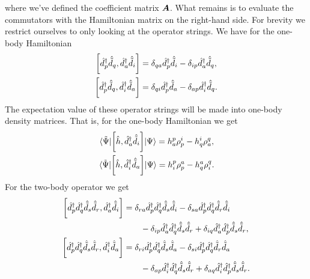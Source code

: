             where we've defined the coefficient matrix $\boldsymbol{A}$.
            What remains is to evaluate the commutators with the Hamiltonian
            matrix on the right-hand side.
            For brevity we restrict ourselves to only looking at the operator
            strings.
            We have for the one-body Hamiltonian
            \begin{gather}
                \left[\hat{d}^{\dagger}_{p}\hat{\tilde{d}}_{q}, \hat{d}^{\dagger}_{a}\hat{\tilde{d}}_{i}\right]
                = \delta_{qa}\hat{d}^{\dagger}_{p}\hat{\tilde{d}}_{i}
                - \delta_{ip}\hat{d}^{\dagger}_{a}\hat{\tilde{d}}_{q}, \\
                \left[\hat{d}^{\dagger}_{p}\hat{\tilde{d}}_{q}, \hat{d}^{\dagger}_{i}\hat{\tilde{d}}_{a}\right]
                = \delta_{qi}\hat{d}^{\dagger}_{p}\hat{\tilde{d}}_{a}
                - \delta_{ap}\hat{d}^{\dagger}_{i}\hat{\tilde{d}}_{q}.
            \end{gather}
            The expectation value of these operator strings will be made into
            one-body density matrices.
            That is, for the one-body Hamiltonian we get
            \begin{gather}
                \mel*{\tilde{\Psi}}{
                    \left[
                        \hat{h}
                    , 
                        \hat{d}^{\dagger}_{a}
                        \hat{\tilde{d}}_{i}
                    \right]
                }{\Psi}
                = h^{p}_{a}\rho^{i}_{p}
                - h^{i}_{q}\rho^{q}_{a},
                \\
                \mel*{\tilde{\Psi}}{
                    \left[
                        \hat{h}
                    , 
                        \hat{d}^{\dagger}_{i}
                        \hat{\tilde{d}}_{a}
                    \right]
                }{\Psi}
                =
                h^{p}_{i}\rho^{a}_{p}
                -
                h^{a}_{q}\rho^{q}_{i}.
            \end{gather}
            For the two-body operator we get
            \begin{align}
                \left[\hat{d}^{\dagger}_{p}\hat{d}^{\dagger}_{q}\hat{\tilde{d}}_{s}\hat{\tilde{d}}_{r}, \hat{d}^{\dagger}_{a}\hat{\tilde{d}}_{i}\right]
                &=
                \delta_{ra}\hat{d}^{\dagger}_{p}\hat{d}^{\dagger}_{q}\hat{\tilde{d}}_{s}\hat{\tilde{d}}_{i}
                - \delta_{sa}\hat{d}^{\dagger}_{p}\hat{d}^{\dagger}_{q}\hat{\tilde{d}}_{r}\hat{\tilde{d}}_{i}
                \nonumber \\
                &\qquad
                - \delta_{ip}\hat{d}^{\dagger}_{a}\hat{d}^{\dagger}_{q}\hat{\tilde{d}}_{s}\hat{\tilde{d}}_{r}
                + \delta_{iq}\hat{d}^{\dagger}_{a}\hat{d}^{\dagger}_{p}\hat{\tilde{d}}_{s}\hat{\tilde{d}}_{r},
                \\
                \left[\hat{d}^{\dagger}_{p}\hat{d}^{\dagger}_{q}\hat{\tilde{d}}_{s}\hat{\tilde{d}}_{r}, \hat{d}^{\dagger}_{i}\hat{\tilde{d}}_{a}\right]
                &=
                \delta_{ri}\hat{d}^{\dagger}_{p}\hat{d}^{\dagger}_{q}\hat{\tilde{d}}_{s}\hat{\tilde{d}}_{a}
                - \delta_{si}\hat{d}^{\dagger}_{p}\hat{d}^{\dagger}_{q}\hat{\tilde{d}}_{r}\hat{\tilde{d}}_{a}
                \nonumber \\
                &\qquad
                - \delta_{ap}\hat{d}^{\dagger}_{i}\hat{d}^{\dagger}_{q}\hat{\tilde{d}}_{s}\hat{\tilde{d}}_{r}
                + \delta_{aq}\hat{d}^{\dagger}_{i}\hat{d}^{\dagger}_{p}\hat{\tilde{d}}_{s}\hat{\tilde{d}}_{r}.
            \end{align}
